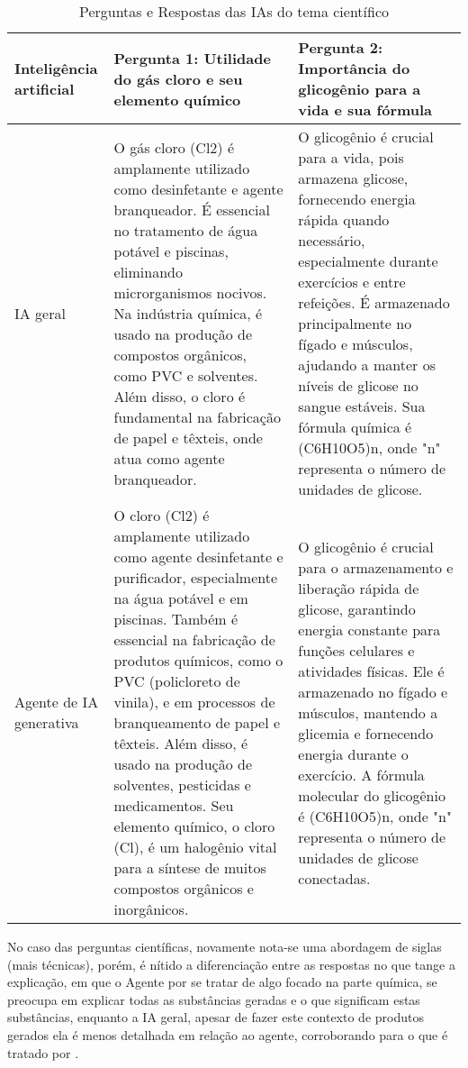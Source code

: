 \documentclass{article}
\begin{document}
\begin{table}[h!]
    \centering
    \begin{tabular}{|p{4cm}|p{4cm}|p{4cm}|}
    \hline
    \textbf{Inteligência artificial} &
    \textbf{Pergunta 1:} Utilidade do gás cloro e seu elemento químico &
    \textbf{Pergunta 2:} Importância do glicogênio para a vida e sua fórmula \\
    \hline
    IA geral &
    O gás cloro (Cl2) é amplamente utilizado como desinfetante e agente branqueador. É essencial no tratamento de água potável e piscinas, eliminando microrganismos nocivos. Na indústria química, é usado na produção de compostos orgânicos, como PVC e solventes. Além disso, o cloro é fundamental na fabricação de papel e têxteis, onde atua como agente branqueador. & 
    O glicogênio é crucial para a vida, pois armazena glicose, fornecendo energia rápida quando necessário, especialmente durante exercícios e entre refeições. É armazenado principalmente no fígado e músculos, ajudando a manter os níveis de glicose no sangue estáveis. Sua fórmula química é (C6H10O5)n, onde "n" representa o número de unidades de glicose. \\
    \hline
    Agente de IA generativa &
    O cloro (Cl2) é amplamente utilizado como agente desinfetante e purificador, especialmente na água potável e em piscinas. Também é essencial na fabricação de produtos químicos, como o PVC (policloreto de vinila), e em processos de branqueamento de papel e têxteis. Além disso, é usado na produção de solventes, pesticidas e medicamentos. Seu elemento químico, o cloro (Cl), é um halogênio vital para a síntese de muitos compostos orgânicos e inorgânicos. & 
    O glicogênio é crucial para o armazenamento e liberação rápida de glicose, garantindo energia constante para funções celulares e atividades físicas. Ele é armazenado no fígado e músculos, mantendo a glicemia e fornecendo energia durante o exercício. A fórmula molecular do glicogênio é (C6H10O5)n, onde "n" representa o número de unidades de glicose conectadas. \\
    \hline
    \end{tabular}
    \caption{Perguntas e Respostas das IAs do tema científico}
    \label{tab:cloro_glicogenio}
\end{table}

No caso das perguntas científicas, novamente nota-se uma abordagem de siglas (mais técnicas), porém, é nítido a diferenciação entre as respostas no que tange a explicação, em que o Agente por se tratar de algo focado na parte química, se preocupa em explicar todas as substâncias geradas e o que significam estas substâncias, enquanto a IA geral, apesar de fazer este contexto de produtos gerados ela é menos detalhada em relação ao agente, corroborando para o que é tratado por \cite{Sampaio2024}.
\end{document}
